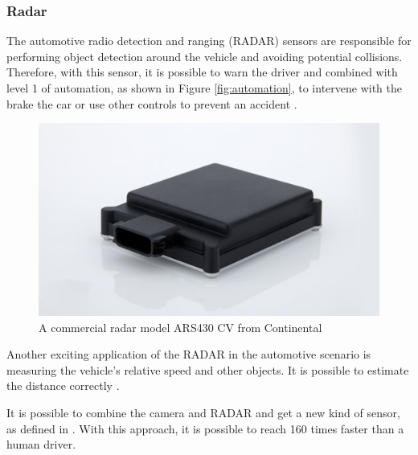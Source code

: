 \subsubsection{Radar}\label{sub:radar}

The automotive radio detection and ranging (RADAR) sensors are responsible for performing object detection around the vehicle and avoiding potential collisions. Therefore, with this sensor, it is possible to warn the driver and combined with level 1 of automation, as shown in Figure \ref{fig:automation}, to intervene with the brake the car or use other controls to prevent an accident \cite{ariyur2006collision}.

\begin{figure}[H]
\centering
\includegraphics[width=120mm]{imagens/radar.jpg}
\caption{A commercial radar model ARS430 CV from Continental}
\label{fig:camera}
\end{figure}

Another exciting application of the RADAR in the automotive scenario is measuring the vehicle's relative speed and other objects. It is possible to estimate the distance correctly  \cite{stevenson2011long}.

It is possible to combine the camera and RADAR and get a new kind of sensor, as defined in \cite{kamerad}. With this approach, it is possible to reach 160 times faster than a human driver.

